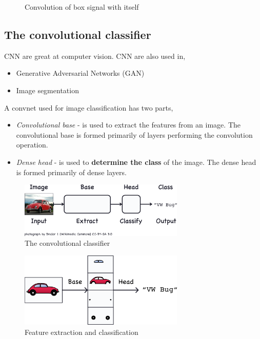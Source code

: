 \begin{figure}[htp]
	\centering
	\caption{Convolution of box signal with itself}
\end{figure}

\subsection{The convolutional classifier}
\noindent CNN are great at computer vision. CNN are also used in,
\begin{itemize}
	\item Generative Adversarial Networks (GAN)
	\item Image segmentation
\end{itemize}

\noindent A convnet used for image classification has two parts,
\begin{itemize}
	\item \emph{Convolutional base} - is used to extract the features from an image. The convolutional
		base is formed primarily of layers performing the convolution operation.
	\item \emph{Dense head} - is used to \textbf{determine the class} of the image. The dense head is
		formed primarily of dense layers.
\end{itemize}

\begin{figure}[htp]
	\centering
	\includegraphics[width=0.7\textwidth]{../assets/machine_learning_random/convnet_high_level_view.png}
	\caption{The convolutional classifier}
\end{figure}

\pagebreak

\begin{figure}[htp]
	\centering
	\includegraphics[width=0.7\textwidth]{../assets/machine_learning_random/conv_base__dense_head.png}
	\caption{Feature extraction and classification}
\end{figure}

